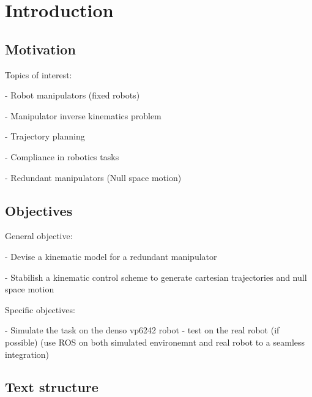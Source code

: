 \chapter{Introduction}\label{cap:introduction}

\section{Motivation}\label{sec:motivation}


Topics of interest:

- Robot manipulators (fixed robots)

- Manipulator inverse kinematics problem

- Trajectory planning

- Compliance in robotics tasks

- Redundant manipulators (Null space motion)


\section{Objectives}\label{sec:objectives}

General objective:

- Devise a kinematic model for a redundant manipulator

- Stabilish a kinematic control scheme to generate cartesian trajectories and null space motion

Specific objectives:

- Simulate the task on the denso vp6242 robot
- test on the real robot (if possible) (use ROS on both simulated environemnt and real robot to a seamless integration)

\section{Text structure}\label{sec:structure}
